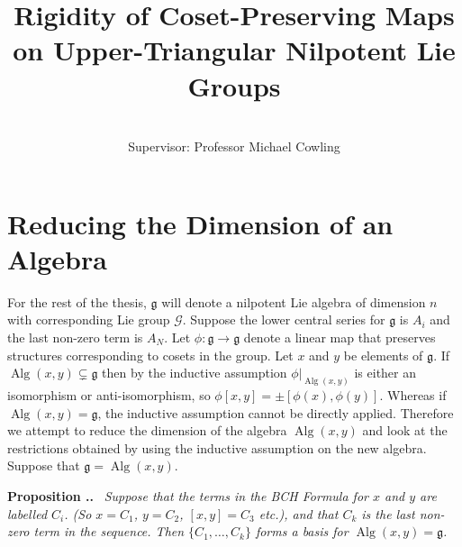 \documentclass[honours]{UNSWthesis}
\title{Rigidity of Coset-Preserving Maps on Upper-Triangular Nilpotent Lie Groups}
\author{\Authornameonly\\{\bigskip}Supervisor: Professor Michael Cowling}
\newcommand{\G}{\mathcal{G}}
\newcommand{\g}{\mathfrak{g}}
\newcommand{\1}{\mathbf{e}_{1}}
\newcommand{\2}{\mathbf{e}_{3}}
\newcommand{\3}{\mathbf{e}_{3}}
\DeclareMathOperator{\alg}{Alg}
\newcounter{Item}[section]
\newenvironment{Proposition}{\medskip
                            \refstepcounter{Item}
                            \noindent
                           {\bf Proposition \thesection.\theItem.}\ %
                            \begingroup \sl}
                           {\endgroup\medskip}
\begin{document}
\maketitle
\section{Reducing the Dimension of an Algebra}
For the rest of the thesis, $\g$ will denote a nilpotent Lie algebra of dimension $n$ with corresponding Lie group $\G$. Suppose the lower central series for $\g$ is $A_{i}$ and the last non-zero term is $A_{N}$. Let $\phi: \g \longrightarrow \g$ denote a linear map that preserves structures corresponding to cosets in the group. \newline
Let $x$ and $y$ be elements of $\g$. If $\alg(x,y)\subsetneq \g$ then by the inductive assumption $\phi|_{\alg(x,y)}$ is either an isomorphism or anti-isomorphism, so $\phi[x,y]= \pm [\phi(x),\phi(y)]$. \newline
Whereas if $\alg(x,y)=\g$, the inductive assumption cannot be directly applied. Therefore we attempt to reduce the dimension of the algebra $\alg(x,y)$ and look at the restrictions obtained by using the inductive assumption on the new algebra. 
\newline Suppose that $\g=\alg(x,y)$.

\begin{Proposition}
Suppose that the terms in the BCH Formula for $x$ and $y$ are labelled $C_{i}$. (So $x=C_{1}$, $y=C_{2}$, $[x,y]=C_{3}$ etc.), and that $C_{k}$ is the last non-zero term in the sequence. 
Then $\{C_{1},\ldots,C_{k}\} $ forms a basis for $\alg(x,y)=\g$.

\end{Proposition}
\end{document}
